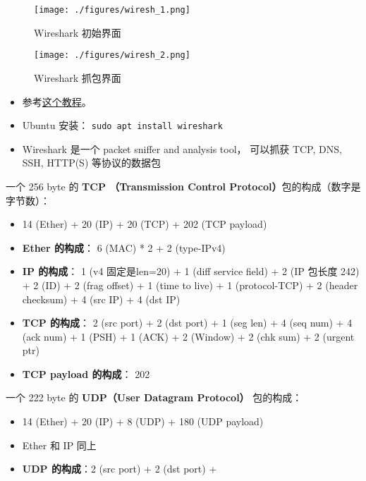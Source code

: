 
\begin{issues}
\issueDraft
\end{issues}

\begin{figure}[ht]
\centering
\texttt{[image: ./figures/wiresh\_1.png]}
\caption{Wireshark 初始界面} \label{wiresh_fig1}
\end{figure}

\begin{figure}[ht]
\centering
\texttt{[image: ./figures/wiresh\_2.png]}
\caption{Wireshark 抓包界面} \label{wiresh_fig2}
\end{figure}


\begin{itemize}
\item 参考\href{https://www.varonis.com/blog/how-to-use-wireshark}{这个教程}。
\item Ubuntu 安装： \verb|sudo apt install wireshark|
\item Wireshark 是一个 packet sniffer and analysis tool， 可以抓获 TCP, DNS, SSH, HTTP(S)   等协议的数据包
\end{itemize}

一个 256 byte 的 \textbf{TCP （Transmission Control Protocol）}包的构成（数字是字节数）：
\begin{itemize}
\item 14 (Ether) + 20 (IP) + 20 (TCP) + 202 (TCP payload)
\item \textbf{Ether 的构成}： 6 (MAC) * 2 + 2 (type-IPv4)
\item \textbf{IP 的构成}： 1 (v4 固定是len=20) + 1 (diff service field) + 2 (IP 包长度 242) + 2 (ID) + 2 (frag offset) + 1 (time to live) + 1 (protocol-TCP) + 2 (header checksum) + 4 (src IP) + 4 (dst IP)
\item \textbf{TCP 的构成}： 2 (src port) + 2 (dst port) + 1 (seg len) + 4 (seq num) + 4 (ack num) + 1 (PSH) + 1 (ACK) + 2 (Window) + 2 (chk sum) + 2 (urgent ptr)
\item \textbf{TCP payload 的构成}： 202
\end{itemize}

一个 222 byte 的 \textbf{UDP（User Datagram Protocol）} 包的构成：
\begin{itemize}
\item 14 (Ether) + 20 (IP) + 8 (UDP) + 180 (UDP payload)
\item Ether 和 IP 同上
\item \textbf{UDP 的构成}：2 (src port) + 2 (dst port) + 
\end{itemize}
